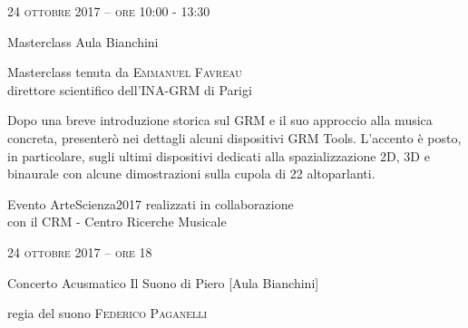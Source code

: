 
\begin{flushright}

\large{
	\scshape{
	24 ottobre 2017 -- ore 10:00 - 13:30
	}}

\medskip
	
\small{Masterclass
	\newline Aula Bianchini}

\medskip

{\fontsize{20}{20} }

\normalfont

\normalsize

\bigskip

Masterclass tenuta da \textsc{Emmanuel Favreau}\\{\footnotesize direttore scientifico dell'INA-GRM di Parigi}


\bigskip

Dopo una breve introduzione storica sul GRM e il suo approccio alla musica concreta, presenterò nei dettagli alcuni dispositivi GRM Tools. L’accento è posto, in particolare, sugli ultimi dispositivi dedicati alla spazializzazione 2D, 3D e binaurale con alcune dimostrazioni sulla cupola di 22 altoparlanti.

\bigskip

\small{Evento ArteScienza2017 realizzati in collaborazione\\con il CRM - Centro Ricerche Musicale}

\vfill

\large{
	\scshape{
	24 ottobre 2017 -- ore 18
	}}

\medskip

\small{Concerto Acusmatico
	\newline Il Suono di Piero [Aula Bianchini]}

\medskip


{\fontsize{20}{20} }

\normalsize

\medskip

regia del suono \textsc{Federico Paganelli}

\bigskip

\medskip

\medskip


\end{flushright}

